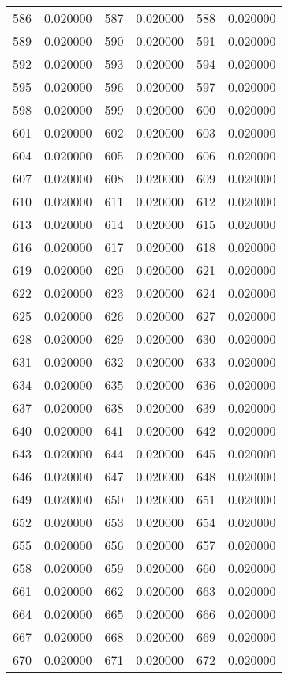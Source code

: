 \documentclass[12pt]{article}
\begin{document}
\begin{longtable}{@{}cc|cc|cc@{}}
586 & 0.020000 & 587 & 0.020000 & 588 & 0.020000 \\
589 & 0.020000 & 590 & 0.020000 & 591 & 0.020000 \\
592 & 0.020000 & 593 & 0.020000 & 594 & 0.020000 \\
595 & 0.020000 & 596 & 0.020000 & 597 & 0.020000 \\
598 & 0.020000 & 599 & 0.020000 & 600 & 0.020000 \\
601 & 0.020000 & 602 & 0.020000 & 603 & 0.020000 \\
604 & 0.020000 & 605 & 0.020000 & 606 & 0.020000 \\
607 & 0.020000 & 608 & 0.020000 & 609 & 0.020000 \\
610 & 0.020000 & 611 & 0.020000 & 612 & 0.020000 \\
613 & 0.020000 & 614 & 0.020000 & 615 & 0.020000 \\
616 & 0.020000 & 617 & 0.020000 & 618 & 0.020000 \\
619 & 0.020000 & 620 & 0.020000 & 621 & 0.020000 \\
622 & 0.020000 & 623 & 0.020000 & 624 & 0.020000 \\
625 & 0.020000 & 626 & 0.020000 & 627 & 0.020000 \\
628 & 0.020000 & 629 & 0.020000 & 630 & 0.020000 \\
631 & 0.020000 & 632 & 0.020000 & 633 & 0.020000 \\
634 & 0.020000 & 635 & 0.020000 & 636 & 0.020000 \\
637 & 0.020000 & 638 & 0.020000 & 639 & 0.020000 \\
640 & 0.020000 & 641 & 0.020000 & 642 & 0.020000 \\
643 & 0.020000 & 644 & 0.020000 & 645 & 0.020000 \\
646 & 0.020000 & 647 & 0.020000 & 648 & 0.020000 \\
649 & 0.020000 & 650 & 0.020000 & 651 & 0.020000 \\
652 & 0.020000 & 653 & 0.020000 & 654 & 0.020000 \\
655 & 0.020000 & 656 & 0.020000 & 657 & 0.020000 \\
658 & 0.020000 & 659 & 0.020000 & 660 & 0.020000 \\
661 & 0.020000 & 662 & 0.020000 & 663 & 0.020000 \\
664 & 0.020000 & 665 & 0.020000 & 666 & 0.020000 \\
667 & 0.020000 & 668 & 0.020000 & 669 & 0.020000 \\
670 & 0.020000 & 671 & 0.020000 & 672 & 0.020000 \\

\end{longtable}
\end{document}
